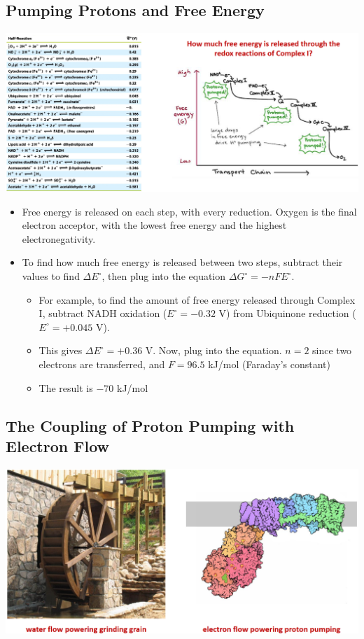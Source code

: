 \documentclass[10pt]{article}
\begin{document}
\subsection*{Pumping Protons and Free Energy}
\begin{center} 
	\includegraphics*[width=\textwidth]{L2_8.png}
\end{center}
\begin{itemize}
	\item Free energy is released on each step, with every reduction.  Oxygen is the final electron acceptor, with the lowest free energy and the highest electronegativity.
	\item To find how much free energy is released between two steps, subtract their values to find $\Delta E^\circ$, then plug into the equation $\Delta G^\circ = -nFE^\circ$.
	\begin{itemize}
        \item For example, to find the amount of free energy released through Complex I, subtract NADH oxidation ($E^\circ = -0.32$ V) from Ubiquinone reduction ($E^\circ = +0.045$ V).
        \item This gives $\Delta E^\circ = +0.36$ V.  Now, plug into the equation.  $n = 2$ since two electrons are transferred, and $F = 96.5$ kJ/mol (Faraday's constant)
        \item The result is $-70$ kJ/mol 
    \end{itemize}
\end{itemize}

\subsection*{The Coupling of Proton Pumping with Electron Flow}
\begin{center} 
	\includegraphics*[width=\textwidth]{L2_9.png}
\end{center}
\end{document}
